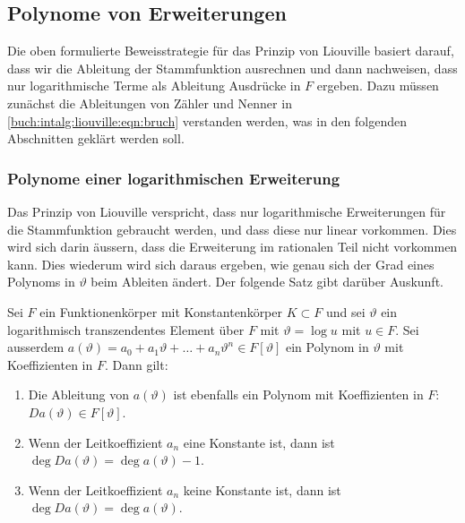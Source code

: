 %
%
\subsection{Polynome von Erweiterungen
\label{buch:intalg:liouville:subsection:polynome}}
Die oben formulierte Beweisstrategie für das Prinzip von Liouville
basiert darauf, dass wir die Ableitung der Stammfunktion ausrechnen
und dann nachweisen, dass nur logarithmische Terme als Ableitung
Ausdrücke in $F$ ergeben.
Dazu müssen zunächst die Ableitungen von Zähler und Nenner in
\eqref{buch:intalg:liouville:eqn:bruch}
verstanden werden, was in den folgenden Abschnitten geklärt werden
soll.

%
%
\subsubsection{Polynome einer logarithmischen Erweiterung}
Das Prinzip von Liouville verspricht, dass nur logarithmische Erweiterungen
für die Stammfunktion gebraucht werden, und dass diese nur linear
vorkommen.
Dies wird sich darin äussern, dass die Erweiterung im rationalen Teil
nicht vorkommen kann.
Dies wiederum wird sich daraus ergeben, wie genau sich der Grad eines
Polynoms in $\vartheta$ beim Ableiten ändert.
Der folgende Satz gibt darüber Auskunft.

\begin{satz}
\label{buch:intalg:liouville:polynome:satz:logarithmisch}
Sei $F$ ein Funktionenkörper mit Konstantenkörper $K\subset F$ und sei
$\vartheta$ ein logarithmisch transzendentes Element über $F$ mit
$\vartheta=\log u$ mit $u\in F$.
Sei ausserdem
$a(\vartheta) = a_0+a_1\vartheta+\dots+a_n\vartheta^n\in F[\vartheta]$
ein Polynom in $\vartheta$ mit Koeffizienten in $F$.
Dann gilt:
\begin{enumerate}
\item
Die Ableitung von $a(\vartheta)$ ist ebenfalls ein Polynom mit Koeffizienten
in $F$: $Da(\vartheta)\in F[\vartheta]$.
\item
Wenn der Leitkoeffizient $a_n$ eine Konstante ist, dann ist
$\deg Da(\vartheta)=\deg a(\vartheta) -1$.
\item
Wenn der Leitkoeffizient $a_n$ keine Konstante ist, dann ist
$\deg Da(\vartheta)=\deg a(\vartheta)$.
\end{enumerate}
\end{satz}


